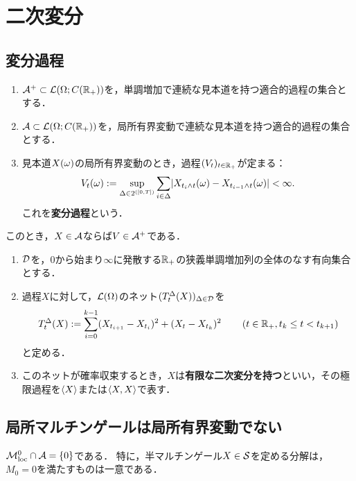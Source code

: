 \documentclass[uplatex,dvipdfmx]{jsreport}
\begin{document}
\section{二次変分}

\subsection{変分過程}

\begin{notation}[単調増加な過程と局所有界変動な過程のクラス]\mbox{}
    \begin{enumerate}
        \item $\A^+\subset\L(\Om;C(\R_+))$を，単調増加で連続な見本道を持つ適合的過程の集合とする．
        \item $\A\subset\L(\Om;C(\R_+))$を，局所有界変動で連続な見本道を持つ適合的過程の集合とする．
        \item 見本道$X(\om)$の局所有界変動のとき，過程$(V_t)_{t\in\R_+}$が定まる：
        \[V_t(\om):=\sup_{\Delta\in 2^{([0,T])}}\sum_{i\in\Delta}\abs{X_{t_i\land t}(\om)-X_{t_{i-1}\land t}(\om)}<\infty.\]
        これを\textbf{変分過程}という．
    \end{enumerate}
    このとき，$X\in\A$ならば$V\in\A^+$である．
\end{notation}

\begin{definition}
    \begin{enumerate}
        \item $\D$を，$0$から始まり$\infty$に発散する$\R_+$の狭義単調増加列の全体のなす有向集合とする．
        \item 過程$X$に対して，$\L(\Om)$のネット$(T^\Delta_t(X))_{\Delta\in\D}$を
        \[T^\Delta_t(X):=\sum^{k-1}_{i=0}(X_{t_{i+1}}-X_{t_i})^2+(X_t-X_{t_k})^2\qquad\paren{t\in\R_+,t_k\le t<t_{k+1}}\]
        と定める．
        \item このネットが確率収束するとき，$X$は\textbf{有限な二次変分を持つ}といい，その極限過程を$\brac{X}$または$\brac{X,X}$で表す．
    \end{enumerate}
\end{definition}

\subsection{局所マルチンゲールは局所有界変動でない}

\begin{theorem}
    $\M^0_\loc\cap\A=\{0\}$である．
    特に，半マルチンゲール$X\in\S$を定める分解は，$M_0=0$を満たすものは一意である．
\end{theorem}
\end{document}
